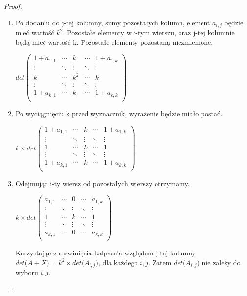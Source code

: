 \begin{proof}
\begin{enumerate}
\item Po dodaniu do j-tej kolumny, sumy pozostałych kolumn, element $a_{i,j}$ będzie mieć wartość $k^2$. Pozostałe elementy w i-tym wierszu, oraz j-tej kolumnie będą mieć wartość k. Pozostałe elementy pozostaną niezmienione. \\
\begin{center}
$det \begin{pmatrix}
 1+a_{1,1} & \cdots & k & \cdots &  1+a_{1,k} \\
 \vdots & \ddots & \vdots & \ddots & \vdots \\
  k & \cdots & k^2 & \cdots & k \\ 
 \vdots & \ddots & \vdots & \ddots & \vdots \\
 1+a_{k,1} & \cdots & k & \cdots &  1+a_{k,k} \\
\end{pmatrix}$ \\
\end{center}

\item Po wyciągnięciu k przed wyznacznik, wyrażenie będzie miało postać. \\
\begin{center}
$k \times det \begin{pmatrix}
 1+a_{1,1} & \cdots & k & \cdots &  1+a_{1,k} \\
 \vdots & \ddots & \vdots & \ddots & \vdots \\
  1 & \cdots & k & \cdots & 1 \\ 
 \vdots & \ddots & \vdots & \ddots & \vdots \\
 1+a_{k,1} & \cdots & k & \cdots &  1+a_{k,k} \\
\end{pmatrix}$ \\
\end{center}
\item Odejmując i-ty wiersz od pozostałych wierszy otrzymamy. 
\begin{center}
$k \times det \begin{pmatrix}
 a_{1,1} & \cdots & 0 & \cdots &  a_{1,k} \\
 \vdots & \ddots & \vdots & \ddots & \vdots \\
  1 & \cdots & k & \cdots & 1 \\ 
 \vdots & \ddots & \vdots & \ddots & \vdots \\
 a_{k,1} & \cdots & 0 & \cdots &  a_{k,k} \\
\end{pmatrix}$ \\
\end{center}

Korzystając z rozwinięcia Lalpace'a względem j-tej kolumny $det \big(A+X \big) = k^2 \times det \big( A_{i,j} \big)$, dla każdego $i, j$. Zatem $det \big( A_{i,j} \big)$ nie zależy do wyboru $i, j$. 

\end{enumerate}


\end{proof}



